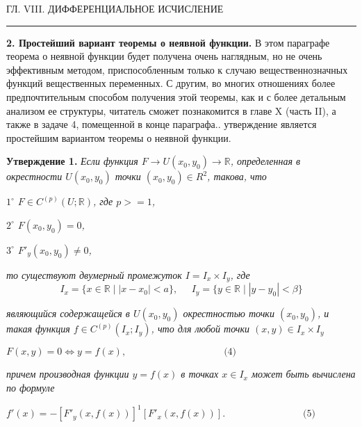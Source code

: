 \documentclass[a4paper, 12pt]{book}
\begin{document}
    \begin{center}
        \begin{spacing}
        
                    ГЛ. VIII. ДИФФЕРЕНЦИАЛЬНОЕ ИСЧИСЛЕНИЕ
            \noindent\rule{\textwidth}{1pt}
	\end{spacing}
    \end{center}
    \par\textbf{2. Простейший вариант теоремы о неявной функции.} В этом
параграфе теорема о неявной функции будет получена очень наглядным, но не очень эффективным методом, приспособленным только к
случаю вещественнозначных функций вещественных переменных.
С другим, во многих отношениях более предпочтительным способом получения этой теоремы, как и с более детальным анализом ее структуры,
читатель сможет познакомится в главе X (часть II), а также в задаче 4,
помещенной в конце параграфа..
     утверждение является простейшим вариантом теоремы
о неявной функции.
    \par\textbf{Утверждение 1.} \textit{Если функция $F \to U(x_0, y_0) \to \mathbb{R}$, определенная в
окрестности $U(x_0, y_0)$ точки $(x_0, y_0) \in R^2$, такова, что}
    \begin{spacing}{1.6}
        \par \textit{$1^\circ$ $F \in C^(p) (U;\mathbb{R})$, где $p >= 1$,}
        \par \textit{$2^\circ$ $F(x_0, y_0) = 0$,}
        \par \textit{$3^\circ$ $F'_y(x_0, y_0) \neq 0$,}
    \end{spacing}
    \par \textit{то существуют двумерный промежуток $I = I_x \times I_y$, где}
    $$I_x = \{x \in \mathbb{R} \mid |x - x_0| < a\}, \;\;\;\;\; I_y=\{ y \in \mathbb{R} \mid |y-y_0| < \beta \}$$
    \par \textit{являющийся содержащейся в $U(x_0, y_0)$ окрестностью точки $(x_0, y_0)$, и
такая функция $f \in C^(p) (I_x; I_y)$, что для любой точки $(x, y) \in I_x \times I_y$}
    \begin{flushright} 
    $F(x, y) = 0 \Leftrightarrow y = f(x),  \quad \quad \quad \quad \quad \quad \quad \quad \quad \quad \textrm{(4)}$
    \end{flushright}
    \par \textit{причем производная функции $y = f(x)$ в точках $x \in I_x$ может быть
вычислена по формуле}
    \begin{flushright} 
    $f'(x) = -[F'_y(x, f(x))]^1[F'_x(x, f(x))]. \quad \quad \quad \quad \quad \quad \quad \quad \textrm{(5)}$
    \end{flushright}
\end{document}
